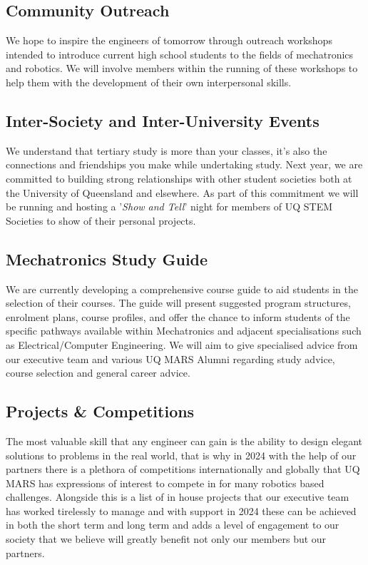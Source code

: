 \documentclass[a4paper,12pt]{report}
\begin{document}
\subsection*{Community Outreach}
We hope to inspire the engineers of tomorrow through outreach workshops intended to introduce current high school students to the fields of mechatronics and robotics.
We will involve members within the running of these workshops to help them with the development of their own interpersonal skills.

\subsection*{Inter-Society and Inter-University Events}
We understand that tertiary study is more than your classes, it's also the connections and friendships you make while undertaking study.
Next year, we are committed to building strong relationships with other student societies both at the University of Queensland and elsewhere.
As part of this commitment we will be running and hosting a '\textit{Show and Tell}' night for members of UQ STEM Societies to show of their personal projects.

\subsection*{Mechatronics Study Guide}
We are currently developing a comprehensive course guide to aid students in the selection of their courses.
The guide will present suggested program structures, enrolment plans, course profiles, and offer the chance to inform students of the specific pathways available within Mechatronics and adjacent specialisations such as Electrical/Computer Engineering.
We will aim to give specialised advice from our executive team and various UQ MARS Alumni regarding study advice, course selection and general career advice.

\subsection*{Projects & Competitions}
The most valuable skill that any engineer can gain is the ability to design elegant solutions to problems in the real world, that is why in 2024 with the help of our partners there is a plethora of competitions internationally and globally that UQ MARS has expressions of interest to compete in for many robotics based challenges. Alongside this is a list of in house projects that our executive team has worked tirelessly to manage and with support in 2024 these can be achieved in both the short term and long term and adds a level of engagement to our society that we believe will greatly benefit not only our members but our partners.
\end{document}
